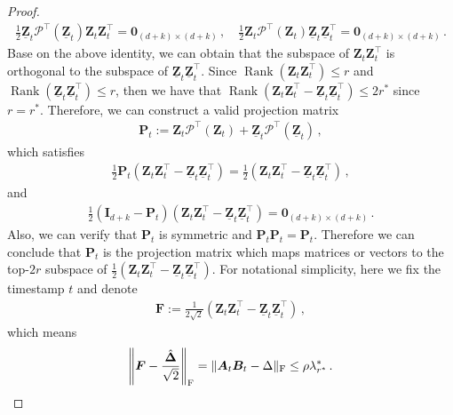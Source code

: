 \begin{proof}
\begin{align*}
    \frac{1}{2}\underline{\bm Z}_t\mathcal{P}^{\!\top}(\underline{\bm Z}_t){\bm Z}_t{\bm Z}_t^{\!\top}=\bm 0_{(d+k)\times(d+k)}\,,\quad \frac{1}{2}{\bm Z}_t\mathcal{P}^{\!\top}({\bm Z}_t)\underline{\bm Z}_t\underline{\bm Z}_t^{\!\top}=\bm 0_{(d+k)\times(d+k)}\,.
\end{align*}
Base on the above identity, we can obtain that the subspace of ${\bm Z}_t{\bm Z}_t^{\!\top}$ is orthogonal to the subspace of $\underline{\bm Z}_t\underline{\bm Z}_t^{\!\top}$. Since $\operatorname{Rank}\left({\bm Z}_t{\bm Z}_t^{\!\top}\right)\leq r$ and $\operatorname{Rank}\left(\underline{\bm Z}_t\underline{\bm Z}_t^{\!\top}\right)\leq r$, then we have that $\operatorname{Rank}\left(\bm Z_t\bm Z_t^{\!\top}-\underline{\bm Z}_t\underline{\bm Z}_t^{\!\top}\right)\leq 2r^*$ since $r=r^*$. Therefore, we can construct a valid projection matrix
\begin{align}
\label{eq:proj-t}
    \mathbf{P}_t:=\bm Z_t\mathcal{P}^{\!\top}(\bm Z_t)+\underline{\bm Z}_t\mathcal{P}^{\!\top}(\underline{\bm Z}_t)\,,
\end{align}
which satisfies
\begin{align*}
    \frac{1}{2}\mathbf{P}_t\left(\bm Z_t\bm Z_t^{\!\top}-\underline{\bm Z}_t\underline{\bm Z}_t^{\!\top}\right)=\frac{1}{2}\left(\bm Z_t\bm Z_t^{\!\top}-\underline{\bm Z}_t\underline{\bm Z}_t^{\!\top}\right)\,,
\end{align*}
and
\begin{align}\label{proj-orth-L}
    \frac{1}{2}\left(\bm I_{d+k}-\mathbf{P}_t\right)\left(\bm Z_t\bm Z_t^{\!\top}-\underline{\bm Z}_t\underline{\bm Z}_t^{\!\top}\right)=\bm 0_{(d+k)\times(d+k)}\,.
\end{align}
Also, we can verify that $\mathbf{P}_t$ is symmetric and $\mathbf{P}_t\mathbf{P}_t=\mathbf{P}_t$. 
Therefore we can conclude that $\mathbf{P}_t$ is the projection matrix which maps matrices or vectors to the top-$2r$ subspace of $\frac{1}{2}\left(\bm Z_t\bm Z_t^{\!\top}-\underline{\bm Z}_t\underline{\bm Z}_t^{\!\top}\right)$. For notational simplicity, here we fix the timestamp $t$ and denote
\begin{align*}
    \bm F := \frac{1}{2\sqrt{2}}\left(\bm Z_t\bm Z_t^{\!\top}-\underline{\bm Z}_t\underline{\bm Z}_t^{\!\top}\right)\,,
\end{align*}
which means
\begin{align}
    \left\|\bm F-\frac{\hat{\bm \Delta}}{\sqrt{2}}\right\|_{\rm F}=\|\bm A_t\bm B_t-\Delta\|_{\rm F}\leq \rho\lambda^*_{r^*}\,.\label{ppppp}

\end{align}
\end{proof}
